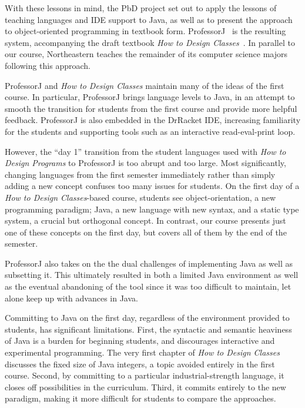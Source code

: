 \documentclass[submission,copyright]{eptcs}
\def\htdp{\emph{How to Design Programs}\xspace}
\def\htdc{\emph{How to Design Classes}\xspace}
\def\profj{{ProfessorJ}\xspace}
\begin{document}
With these lessons in mind, the PbD project set out to apply
the lessons of teaching languages and IDE support to Java, as well as
to present the approach to object-oriented programming in textbook
form. ProfessorJ~\cite{dvanhorn:Gray2003ProfessorJ} is the resulting
system, accompanying the draft textbook \emph{How to Design
  Classes}~\cite{local:htdc}.  In parallel to our course, Northeastern
teaches the remainder of its computer science majors following this
approach.

ProfessorJ and \emph{How to Design Classes} maintain many of the ideas
of the first course.  In particular, ProfessorJ brings language levels
to Java, in an attempt to smooth the transition for students from the
first course and provide more helpful feedback.  ProfessorJ is also
embedded in the DrRacket IDE, increasing familiarity for the students
and supporting tools such as an interactive read-eval-print loop.


However, the ``day 1'' transition from the student languages used with
\htdp to \profj is too abrupt and too large.
%
Most significantly, changing languages from the first semester
immediately rather than simply adding a new concept confuses too many
issues for students.  On the first day of a \htdc-based course,
students see object-orientation, a new programming paradigm; Java, a
new language with new syntax, and a static type system, a crucial but
orthogonal concept.
%
In contrast, our course presents just one of these concepts on the
first day, but  covers all of them by the end of the semester.

\profj also takes on the the dual challenges of implementing Java as
well as subsetting it.  This ultimately resulted in both a limited
Java environment as well as the eventual abandoning of the tool since
it was too difficult to maintain, let alone keep up with advances in
Java.  

Committing to Java on the first day, regardless of the environment
provided to students, has significant limitations.  First, the
syntactic and semantic heaviness of Java is a burden for beginning
students, and discourages interactive and experimental programming.
The very first chapter of \htdc discusses the fixed size of Java
integers, a topic avoided entirely in the first course.  Second, by
committing to a particular industrial-strength language, it closes off
possibilities in the curriculum.  Third, it commits entirely to the
new paradigm, making it more difficult for students to compare the
approaches.
\end{document}
